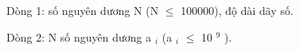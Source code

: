 Dòng 1: số nguyên dương N (N  $\le$  100000), độ dài dãy số.

Dòng 2: N số nguyên dương a $_ i $ (a $_ i $  $\le$  10 $^ 9 $ ).